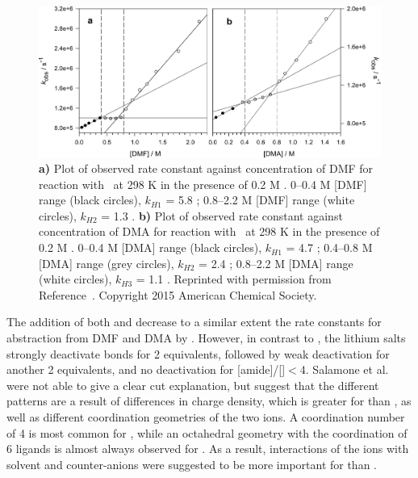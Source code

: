 \begin{figure}[!htbp]
  \includegraphics[width=\textwidth]{figures/kH-dma-dmf-mgclo42.png}
  \caption[Plot of observed rate constant against concentration of DMF and DMA
  for reaction with \cumo\ at 298 K in the presence of 0.2 M .]
  {\textbf{a)} Plot of observed rate constant against concentration of DMF for
	  reaction with \cumo\ at 298 K in the presence of 0.2 M
	  . 0--0.4 M [DMF] range (black circles), $k_{H1}$ =
	  5.8 \Ms; 0.8--2.2 M [DMF] range (white circles), $k_{H2}$ =
	  1.3 \Ms.  \textbf{b)} Plot of observed rate constant against
  concentration of DMA for reaction with \cumo\ at 298 K in the presence of 0.2
  M . 0--0.4 M [DMA] range (black circles), $k_{H1}$ = 4.7
  \Ms; 0.4--0.8 M [DMA] range (grey circles), $k_{H2}$ = 2.4 \Ms; 0.8--2.2
  M [DMA] range (white circles), $k_{H3}$ = 1.1 \Ms. Reprinted with
  permission from Reference~\protect{}. Copyright
  2015 American Chemical Society.} \label{fig:k-metals-mg}
\end{figure}

The addition of both  and  decrease to a similar extent the
rate constants for abstraction from DMF and DMA by \cumo. However, in contrast
to , the lithium salts strongly deactivate  bonds for 2
equivalents, followed by weak deactivation for another 2 equivalents, and no
deactivation for [amide]/[]$<$4. Salamone et al. were not able to
give a clear cut explanation, but suggest that the different patterns are a
result of differences in charge density, which is greater for  than
, as well as different coordination geometries of the two ions. A
coordination number of 4 is most common for , while an octahedral
geometry with the coordination of 6 ligands is almost always observed for
.\cite{Babu2013, Dudev2014} As a result, interactions of the ions
with solvent and counter-anions were suggested to be more important for
 than .

